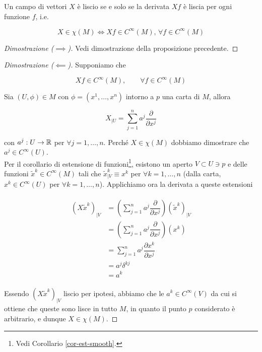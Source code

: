 \begin{definition}
	Un campo di vettori $ X $ è liscio se e solo se la derivata $ X f $ è liscia per ogni funzione $ f $, i.e.
	
	\begin{equation}
		X \in \chi(M) \iff X f \in C^{\infty}(M), \, \forall f \in C^{\infty}(M)
	\end{equation}
\end{definition}

\begin{proof}[Dimostrazione ($ \implies $)]
	Vedi dimostrazione della proposizione precedente.
\end{proof}

\begin{proof}[Dimostrazione ($ \impliedby $)]
	Supponiamo che
	
	\begin{equation}
		X f \in C^{\infty}(M), \qquad \forall f \in C^{\infty}(M)
	\end{equation}

	Sia $ (U,\phi) \in M $ con $ \phi = (x^{1},\dots,x^{n}) $ intorno a $ p $ una carta di $ M $, allora
	
	\begin{equation}
		X_{|U} = \sum_{j=1}^{n} a^{j} \dfrac{\partial}{\partial x^{j}}
	\end{equation}

	con $ a^{j} : U \to \mathbb{R} $ per $ \forall j=1,\dots,n $. Perché $ X \in \chi(M) $ dobbiamo dimostrare che $ a^{j} \in C^{\infty}(U) $.\\
	Per il corollario di estensione di funzioni\footnote{%
		Vedi Corollario \ref{cor-est-smooth}.%
	}, esistono un aperto $ V \subset U \ni p $ e delle funzioni $ \tilde{x}^{k} \in C^{\infty}(M) $ tali che $ \tilde{x}^{k}_{|V} \equiv x^{k} $ per $ \forall k=1,\dots,n $ (dalla carta, $ x^{k} \in C^{\infty}(U) $ per $ \forall k=1,\dots,n $). Applichiamo ora la derivata a queste estensioni
	
	\begin{align}
		\begin{split}
			(X \tilde{x}^{k})_{|V} &= \left( \sum_{j=1}^{n} a^{j} \dfrac{\partial}{\partial x^{j}} \right) (\tilde{x}^{k})_{|V}\\
			&= \left( \sum_{j=1}^{n} a^{j} \dfrac{\partial}{\partial x^{j}} \right) (x^{k})\\
			&= \sum_{j=1}^{n} a^{j} \dfrac{\partial x^{k}}{\partial x^{j}}\\
			&= a^{j} \delta^{kj}\\
			&= a^{k}
		\end{split}
	\end{align}

	Essendo $ (X \tilde{x}^{k})_{|V} $ liscio per ipotesi, abbiamo che le $ a^{k} \in C^{\infty}(V) $ da cui si ottiene che queste sono lisce in tutto $ M $, in quanto il punto $ p $ considerato è arbitrario, e dunque $ X \in \chi(M) $.
\end{proof}

